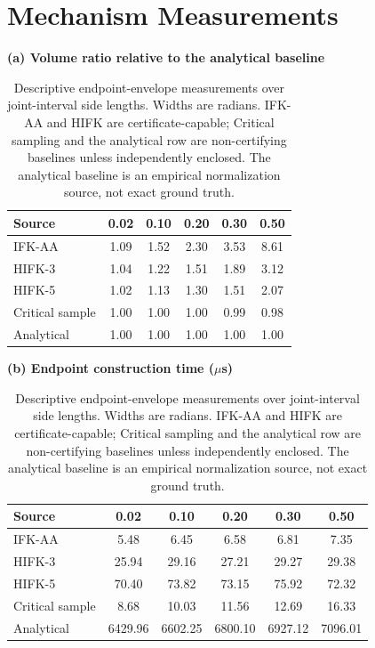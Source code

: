 \documentclass[journal]{IEEEtran}
\begin{document}
\begin{table}[!t]
\section{Mechanism Measurements}\label{app:mechanism_tables}
\centering
\caption{Descriptive endpoint-envelope measurements over joint-interval side
lengths. Widths are radians. IFK-AA and HIFK are certificate-capable; Critical
sampling and the analytical row are non-certifying baselines unless independently
enclosed. The analytical baseline is an empirical normalization source, not
exact ground truth.}
\label{tab:mechanism_endpoint}
\scriptsize
\setlength{\tabcolsep}{4pt}
\renewcommand{\arraystretch}{1.02}
\textbf{(a) Volume ratio relative to the analytical baseline}\\[0.3ex]
\begin{tabular}{@{}lccccc@{}}
\toprule
Source & 0.02 & 0.10 & 0.20 & 0.30 & 0.50 \\
\midrule
IFK-AA & 1.09 & 1.52 & 2.30 & 3.53 & 8.61 \\
HIFK-3 & 1.04 & 1.22 & 1.51 & 1.89 & 3.12 \\
HIFK-5 & 1.02 & 1.13 & 1.30 & 1.51 & 2.07 \\
Critical sample & 1.00 & 1.00 & 1.00 & 0.99 & 0.98 \\
Analytical & 1.00 & 1.00 & 1.00 & 1.00 & 1.00 \\
\bottomrule
\end{tabular}

\vspace{0.7ex}
\textbf{(b) Endpoint construction time ($\mu$s)}\\[0.3ex]
\begin{tabular}{@{}lccccc@{}}
\toprule
Source & 0.02 & 0.10 & 0.20 & 0.30 & 0.50 \\
\midrule
IFK-AA & 5.48 & 6.45 & 6.58 & 6.81 & 7.35 \\
HIFK-3 & 25.94 & 29.16 & 27.21 & 29.27 & 29.38 \\
HIFK-5 & 70.40 & 73.82 & 73.15 & 75.92 & 72.32 \\
Critical sample & 8.68 & 10.03 & 11.56 & 12.69 & 16.33 \\
Analytical & 6429.96 & 6602.25 & 6800.10 & 6927.12 & 7096.01 \\
\bottomrule
\end{tabular}


\end{table}
\end{document}
